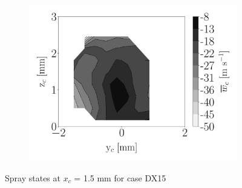 \begin{figure}[h!]
\begin{subfigure}[b]{0.3\textwidth}
	\centering
   \includegraphics[scale=\scaleSLIBIMER]{./part3_applications/figures_ch8_resolved/injectors_SLI/dx15_xD05p00_uz_mean_map}
\end{subfigure}
\caption{Spray states at $x_c$ = 1.5 mm for case DX15}
\label{fig:injectors_sli_BIMER_DX15_xD05}
\end{figure}




